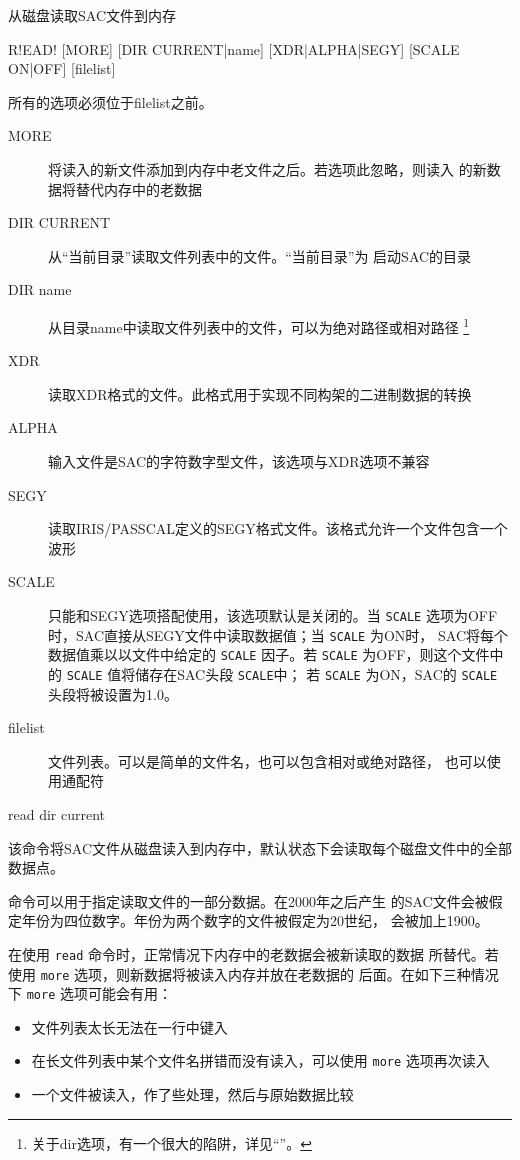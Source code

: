 \label{cmd:read}

从磁盘读取SAC文件到内存

\begin{SACSTX}
R!EAD! [MORE] [DIR CURRENT|name] [XDR|ALPHA|SEGY]
    [SCALE ON|OFF] [filelist]
\end{SACSTX}
所有的选项必须位于filelist之前。

\begin{description}
\item [MORE] 将读入的新文件添加到内存中老文件之后。若选项此忽略，则读入
    的新数据将替代内存中的老数据
\item [DIR CURRENT] 从``当前目录''读取文件列表中的文件。``当前目录''为
    启动SAC的目录
\item [DIR name] 从目录name中读取文件列表中的文件，可以为绝对路径或相对路径
    \footnote{关于dir选项，有一个很大的陷阱，详见``''。}
\item [XDR] 读取XDR格式的文件。此格式用于实现不同构架的二进制数据的转换
\item [ALPHA] 输入文件是SAC的字符数字型文件，该选项与XDR选项不兼容
\item [SEGY] 读取IRIS/PASSCAL定义的SEGY格式文件。该格式允许一个文件包含一个波形
\item [SCALE] 只能和SEGY选项搭配使用，该选项默认是关闭的。当 \texttt{SCALE}
    选项为OFF时，SAC直接从SEGY文件中读取数据值；当 \texttt{SCALE} 为ON时，
    SAC将每个数据值乘以以文件中给定的 \texttt{SCALE} 因子。若 \texttt{SCALE}
    为OFF，则这个文件中的 \texttt{SCALE} 值将储存在SAC头段 \texttt{SCALE}中；
    若 \texttt{SCALE} 为ON，SAC的 \texttt{SCALE} 头段将被设置为1.0。
\item [filelist] 文件列表。可以是简单的文件名，也可以包含相对或绝对路径，
    也可以使用通配符
\end{description}

\begin{SACDFT}
read dir current
\end{SACDFT}

该命令将SAC文件从磁盘读入到内存中，默认状态下会读取每个磁盘文件中的全部
数据点。

 命令可以用于指定读取文件的一部分数据。在2000年之后产生
的SAC文件会被假定年份为四位数字。年份为两个数字的文件被假定为20世纪，
会被加上1900。

在使用 \texttt{read} 命令时，正常情况下内存中的老数据会被新读取的数据
所替代。若使用 \texttt{more} 选项，则新数据将被读入内存并放在老数据的
后面。在如下三种情况下 \texttt{more} 选项可能会有用：
\begin{itemize}
\item 文件列表太长无法在一行中键入
\item 在长文件列表中某个文件名拼错而没有读入，可以使用 \texttt{more} 选项再次读入
\item 一个文件被读入，作了些处理，然后与原始数据比较
\end{itemize}

